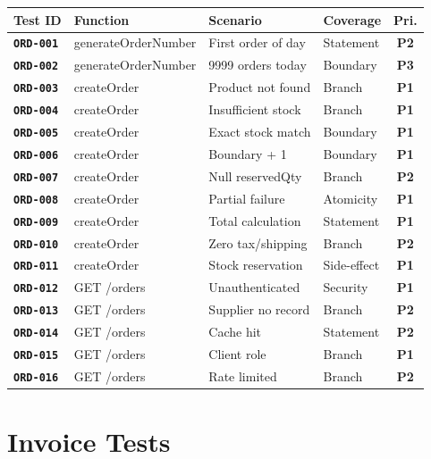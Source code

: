 \documentclass[12pt,a4paper]{report}
\newcommand{\testid}[1]{\texttt{\textbf{\color{secondary}#1}}}
\newcommand{\pone}{\textbf{\color{p1red}P1}}
\newcommand{\ptwo}{\textbf{\color{p2orange}P2}}
\newcommand{\pthree}{\textbf{\color{p3blue}P3}}
\begin{document}
\begin{longtable}{p{2cm}p{3.5cm}p{5cm}p{1.5cm}c}
  \toprule
  \textbf{Test ID} & \textbf{Function} & \textbf{Scenario} & \textbf{Coverage} & \textbf{Pri.} \\
  \midrule
  \endhead
  \testid{ORD-001} & generateOrderNumber & First order of day & Statement & \ptwo \\
  \testid{ORD-002} & generateOrderNumber & 9999 orders today & Boundary & \pthree \\
  \testid{ORD-003} & createOrder & Product not found & Branch & \pone \\
  \testid{ORD-004} & createOrder & Insufficient stock & Branch & \pone \\
  \testid{ORD-005} & createOrder & Exact stock match & Boundary & \pone \\
  \testid{ORD-006} & createOrder & Boundary + 1 & Boundary & \pone \\
  \testid{ORD-007} & createOrder & Null reservedQty & Branch & \ptwo \\
  \testid{ORD-008} & createOrder & Partial failure & Atomicity & \pone \\
  \testid{ORD-009} & createOrder & Total calculation & Statement & \pone \\
  \testid{ORD-010} & createOrder & Zero tax/shipping & Branch & \ptwo \\
  \testid{ORD-011} & createOrder & Stock reservation & Side-effect & \pone \\
  \testid{ORD-012} & GET /orders & Unauthenticated & Security & \pone \\
  \testid{ORD-013} & GET /orders & Supplier no record & Branch & \ptwo \\
  \testid{ORD-014} & GET /orders & Cache hit & Statement & \ptwo \\
  \testid{ORD-015} & GET /orders & Client role & Branch & \pone \\
  \testid{ORD-016} & GET /orders & Rate limited & Branch & \ptwo \\
  \bottomrule
\end{longtable}

\section{Invoice Tests}
\end{document}
